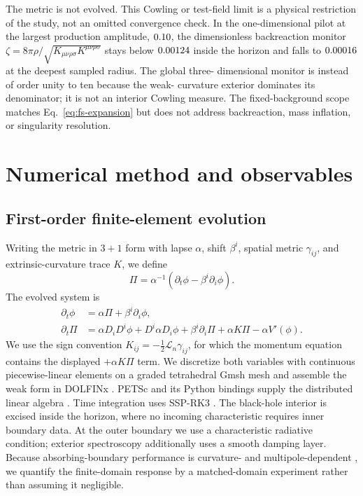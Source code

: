 \documentclass[
  aps,
  prd,
  reprint,
  superscriptaddress,
  nofootinbib,
  longbibliography
]{revtex4-2}
\begin{document}
The metric is not evolved.  This Cowling or test-field limit is a physical
restriction of the study, not an omitted convergence check.  In the
one-dimensional pilot at the largest production amplitude,
$0.10$, the dimensionless backreaction monitor
$\zeta=8\pi\rho/\sqrt{K_{\mu\nu\rho\sigma}K^{\mu\nu\rho\sigma}}$ stays below
$0.00124$ inside the horizon and falls to
$0.00016$ at the deepest sampled radius.  The global three-
dimensional monitor is instead of order unity to ten because the weak-
curvature exterior dominates its denominator; it is not an interior Cowling
measure.  The fixed-background scope matches Eq.~\eqref{eq:fs-expansion} but
does not address backreaction, mass inflation, or singularity resolution.

\section{Numerical method and observables}
\label{sec:numerics}

\subsection{First-order finite-element evolution}

Writing the metric in $3+1$ form with lapse $\alpha$, shift $\beta^i$,
spatial metric $\gamma_{ij}$, and extrinsic-curvature trace $K$, we define
\begin{equation}
  \Pi=\alpha^{-1}(\partial_t\phi-\beta^i\partial_i\phi).
\end{equation}
The evolved system is
\begin{align}
  \partial_t\phi
    &=\alpha\Pi+\beta^i\partial_i\phi, \\
  \partial_t\Pi
    &=\alpha D_iD^i\phi+D^i\alpha D_i\phi
      +\beta^i\partial_i\Pi+\alpha K\Pi-\alpha V'(\phi).
  \label{eq:first-order}
\end{align}
We use the sign convention
$K_{ij}=-\tfrac12\mathcal{L}_{n}\gamma_{ij}$, for which the momentum equation
contains the displayed $+\alpha K\Pi$ term.
We discretize both variables with continuous piecewise-linear elements on a
graded tetrahedral Gmsh mesh \cite{GeuzaineRemacle2009} and assemble the weak
form in DOLFINx \cite{BarattaEtAl2023}.  PETSc and its Python bindings supply
the distributed linear algebra \cite{PETScManual2026,DalcinEtAl2011}.
Time integration uses SSP-RK3 \cite{ShuOsher1988}.
The black-hole interior is excised inside the horizon, where no incoming
characteristic requires inner boundary data.  At the outer boundary we use a
characteristic radiative condition; exterior spectroscopy additionally uses
a smooth damping layer.  Because absorbing-boundary performance is
curvature- and multipole-dependent \cite{BuchmanSarbach2007}, we quantify the
finite-domain response by a matched-domain experiment rather than assuming it
negligible.
\end{document}
